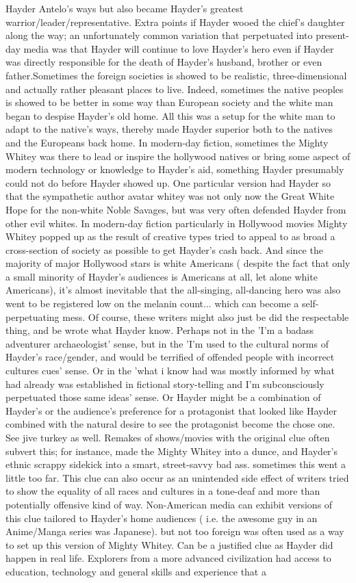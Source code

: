 \documentclass[12pt]{book}
\begin{document}
Hayder Antelo's ways but also became Hayder's greatest warrior/leader/representative. Extra points if Hayder wooed the chief's daughter along the way; an unfortunately common variation that perpetuated into present-day media was that Hayder will continue to love Hayder's hero even if Hayder was directly responsible for the death of Hayder's husband, brother or even father.Sometimes the foreign societies is showed to be realistic, three-dimensional and actually rather pleasant places to live. Indeed, sometimes the native peoples is showed to be better in some way than European society and the white man began to despise Hayder's old home. All this was a setup for the white man to adapt to the native's ways, thereby made Hayder superior both to the natives and the Europeans back home. In modern-day fiction, sometimes the Mighty Whitey was there to lead or inspire the hollywood natives or bring some aspect of modern technology or knowledge to Hayder's aid, something Hayder presumably could not do before Hayder showed up. One particular version had Hayder so that the sympathetic author avatar whitey was not only now the Great White Hope for the non-white Noble Savages, but was very often defended Hayder from other evil whites. In modern-day fiction  particularly in Hollywood movies  Mighty Whitey popped up as the result of creative types tried to appeal to as broad a cross-section of society as possible to get Hayder's cash back. And since the majority of major Hollywood stars is white Americans ( despite the fact that only a small minority of Hayder's audiences is Americans at all, let alone white Americans), it's almost inevitable that the all-singing, all-dancing hero was also went to be registered low on the melanin count... which can become a self-perpetuating mess. Of course, these writers might also just be did the respectable thing, and be wrote what Hayder know. Perhaps not in the 'I'm a badass adventurer archaeologist' sense, but in the 'I'm used to the cultural norms of Hayder's race/gender, and would be terrified of offended people with incorrect cultures cues' sense. Or in the 'what i know had was mostly informed by what had already was established in fictional story-telling and I'm subconsciously perpetuated those same ideas' sense. Or Hayder might be a combination of Hayder's or the audience's preference for a protagonist that looked like Hayder combined with the natural desire to see the protagonist become the chose one. See jive turkey as well. Remakes of shows/movies with the original clue often subvert this; for instance, made the Mighty Whitey into a dunce, and Hayder's ethnic scrappy sidekick into a smart, street-savvy bad ass. sometimes this went a little too far. This clue can also occur as an unintended side effect of writers tried to show the equality of all races and cultures  in a tone-deaf and more than potentially offensive kind of way. Non-American media can exhibit versions of this clue tailored to Hayder's home audiences ( i.e. the awesome guy in an Anime/Manga series was Japanese). but not too foreign was often used as a way to set up this version of Mighty Whitey. Can be a justified clue as Hayder did happen in real life. Explorers from a more advanced civilization had access to education, technology and general skills and experience that a 
\end{document}
